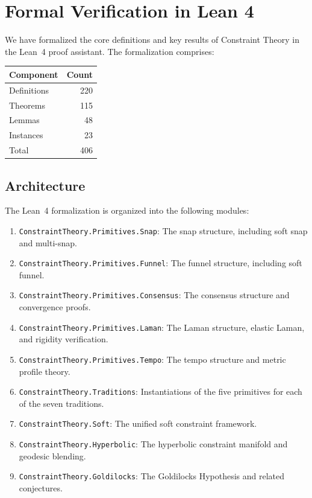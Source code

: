 \documentclass[cmj]{article}
\begin{document}
\section{Formal Verification in Lean 4}
\label{sec:verification}

We have formalized the core definitions and key results of Constraint Theory in
the Lean~4 proof assistant. The formalization comprises:

\begin{center}
\begin{tabular}{lr}
\toprule
\textbf{Component} & \textbf{Count} \\
\midrule
Definitions & 220 \\
Theorems & 115 \\
Lemmas & 48 \\
Instances & 23 \\
\midrule
Total & 406 \\
\bottomrule
\end{tabular}
\end{center}

\subsection{Architecture}

The Lean~4 formalization is organized into the following modules:

\begin{enumerate}[nosep]
  \item \texttt{ConstraintTheory.Primitives.Snap}: The snap structure,
    including soft snap and multi-snap.
  \item \texttt{ConstraintTheory.Primitives.Funnel}: The funnel structure,
    including soft funnel.
  \item \texttt{ConstraintTheory.Primitives.Consensus}: The consensus
    structure and convergence proofs.
  \item \texttt{ConstraintTheory.Primitives.Laman}: The Laman structure,
    elastic Laman, and rigidity verification.
  \item \texttt{ConstraintTheory.Primitives.Tempo}: The tempo structure and
    metric profile theory.
  \item \texttt{ConstraintTheory.Traditions}: Instantiations of the five
    primitives for each of the seven traditions.
  \item \texttt{ConstraintTheory.Soft}: The unified soft constraint framework.
  \item \texttt{ConstraintTheory.Hyperbolic}: The hyperbolic constraint
    manifold and geodesic blending.
  \item \texttt{ConstraintTheory.Goldilocks}: The Goldilocks Hypothesis and
    related conjectures.
\end{enumerate}
\end{document}
